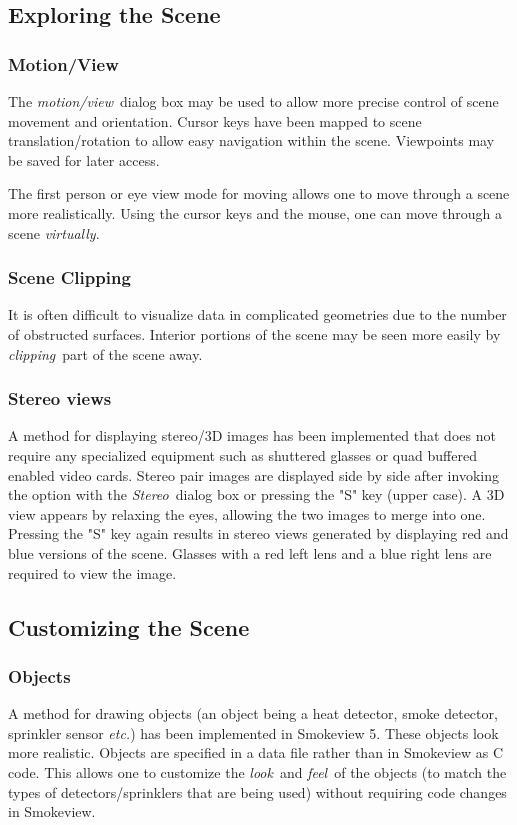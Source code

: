 \documentclass[11pt,twoside]{book}
\begin{document}
\subsection{Exploring the Scene}

\subsubsection{Motion/View} The {\em motion/view}\ dialog box may be used to
allow more precise control of scene movement and orientation.
Cursor keys have been mapped to scene translation/rotation to
allow easy navigation within the scene.  Viewpoints may be saved for later access.

The first person or eye view mode for moving
allows one to move through a scene more
realistically.  Using the cursor keys and the
mouse, one can move through a scene {\em virtually}.

\subsubsection{Scene Clipping} It is often difficult to visualize data
in complicated geometries due to the number of
obstructed surfaces. Interior portions of the scene may be
seen more easily by {\em clipping}\ part of the scene away.

\subsubsection{Stereo views}A method for displaying stereo/3D images has been implemented that does
not require any specialized equipment such as shuttered glasses or quad buffered enabled video cards.  Stereo pair images are displayed side by side after invoking the option with
the {\em Stereo}\ dialog box or pressing the "S" key (upper case).  A 3D view appears by relaxing the eyes, allowing the two images to merge into one.
Pressing the "S" key again results in stereo views generated by displaying red and blue versions of the scene.  Glasses with a red left lens and a blue right lens are required to view the image.

\subsection{Customizing the Scene}

\subsubsection{Objects}A method for drawing objects (an object
being a heat detector, smoke detector, sprinkler sensor {\em
etc.}) has been implemented in Smokeview 5.  These objects look
more realistic.  Objects are specified in a data file rather than
in Smokeview as C code. This allows one to customize the
{\em look}\ and {\em feel}\ of the objects (to match the types of
detectors/sprinklers that are being used) without requiring code
changes in Smokeview.
\end{document}
